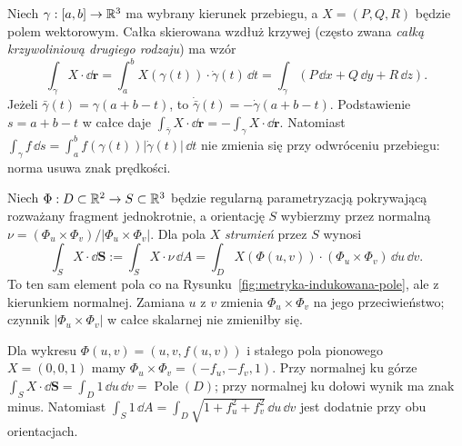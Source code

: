 \begin{przyklad}
\label{prz:calka-skierowana-krzywa}
Niech $\gamma:[a,b]\to\mathbb{R}^3$ ma wybrany kierunek
przebiegu, a $X=(P,Q,R)$ będzie polem wektorowym.
Całka skierowana wzdłuż
krzywej (często zwana \emph{całką krzywoliniową
drugiego rodzaju}) ma wzór
\begin{equation}\label{eq:calka-skierowana-krzywa}
 \int_\gamma X\cdot\dd\mathbf r
 =\int_a^b X(\gamma(t))\cdot\dot\gamma(t)\,\dd t
 =\int_\gamma(P\,\dd x+Q\,\dd y+R\,\dd z).
\end{equation}
Jeżeli $\bar\gamma(t)=\gamma(a+b-t)$, to
$\dot{\bar\gamma}(t)=-\dot\gamma(a+b-t)$.
Podstawienie $s=a+b-t$ w całce daje
$\int_{\bar\gamma}X\cdot\dd\mathbf r
=-\int_\gamma X\cdot\dd\mathbf r$.
Natomiast $\int_\gamma f\,\dd s
=\int_a^b f(\gamma(t))|\dot\gamma(t)|\,\dd t$
nie zmienia się przy odwróceniu przebiegu:
norma usuwa znak prędkości.
\end{przyklad}

\begin{przyklad}
\label{prz:calka-skierowana-powierzchnia}
Niech $\Phi:D\subset\mathbb{R}^2\to S\subset\mathbb{R}^3$
będzie regularną parametryzacją pokrywającą rozważany
fragment jednokrotnie, a orientację
$S$ wybierzmy przez normalną
$\nu=(\Phi_u\times\Phi_v)/|\Phi_u\times\Phi_v|$.
Dla pola $X$ \emph{strumień} przez $S$ wynosi
\begin{equation}\label{eq:calka-skierowana-powierzchnia}
 \int_S X\cdot\dd\mathbf S
 :=\int_S X\cdot\nu\,\dd A
 =\int_D X(\Phi(u,v))\cdot
           (\Phi_u\times\Phi_v)\,\dd u\,\dd v.
\end{equation}
To ten sam element pola co na
Rysunku~\ref{fig:metryka-indukowana-pole},
ale z kierunkiem normalnej.
Zamiana $u$ z $v$ zmienia
$\Phi_u\times\Phi_v$ na jego przeciwieństwo;
czynnik $|\Phi_u\times\Phi_v|$ w całce skalarnej
nie zmieniłby się.

Dla wykresu $\Phi(u,v)=(u,v,f(u,v))$
i stałego pola pionowego $X=(0,0,1)$ mamy
$\Phi_u\times\Phi_v=(-f_u,-f_v,1)$.
Przy normalnej ku górze
$\int_S X\cdot\dd\mathbf S=\int_D1\,\dd u\,\dd v
=\operatorname{Pole}(D)$; przy normalnej ku dołowi
wynik ma znak minus. Natomiast
$\int_S1\,\dd A
=\int_D\sqrt{1+f_u^2+f_v^2}\,\dd u\,\dd v$
jest dodatnie przy obu orientacjach.
\end{przyklad}

